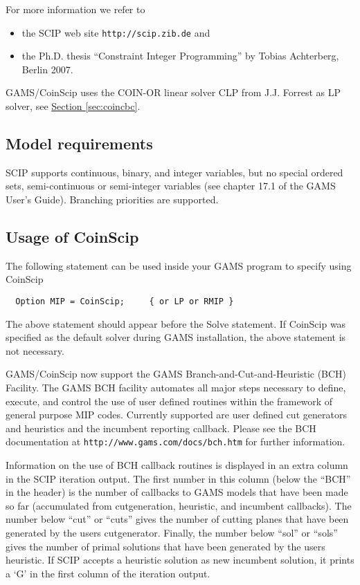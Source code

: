 For more information we refer to
\begin{itemize}
\item the SCIP web site \texttt{http://scip.zib.de} and
\item the Ph.D. thesis ``Constraint Integer Programming'' by Tobias Achterberg, Berlin 2007.
\end{itemize}

GAMS/CoinScip uses the COIN-OR linear solver CLP from J.J. Forrest as LP solver, see \hyperlink{sec:coincbc}{Section \ref{sec:coincbc}}.

\subsection{Model requirements}

SCIP supports continuous, binary, and integer variables, but no special ordered sets, semi-continuous or semi-integer variables (see chapter 17.1 of the GAMS User's Guide).
Branching priorities are supported.

\subsection{Usage of CoinScip}

The following statement can be used inside your GAMS program to specify using CoinScip
\begin{verbatim}
  Option MIP = CoinScip;     { or LP or RMIP }
\end{verbatim}

The above statement should appear before the Solve statement.
If CoinScip was specified as the default solver during GAMS installation, the above statement is not necessary.

GAMS/CoinScip now support the GAMS Branch-and-Cut-and-Heuristic (BCH) Facility.
The GAMS BCH facility automates all major steps necessary to define, execute, and control the use of user defined routines within the framework of general purpose MIP codes.
Currently supported are user defined cut generators and heuristics and the incumbent reporting callback.
Please see the BCH documentation at \texttt{http://www.gams.com/docs/bch.htm} for further information.

Information on the use of BCH callback routines is displayed in an extra column in the SCIP iteration output.
The first number in this column (below the ``BCH'' in the header) is the number of callbacks to GAMS models that have been made so far (accumulated from cutgeneration, heuristic, and incumbent callbacks).
The number below ``cut'' or ``cuts'' gives the number of cutting planes that have been generated by the users cutgenerator.
Finally, the number below ``sol'' or ``sols'' gives the number of primal solutions that have been generated by the users heuristic.
If SCIP accepts a heuristic solution as new incumbent solution, it prints a `G' in the first column of the iteration output.

